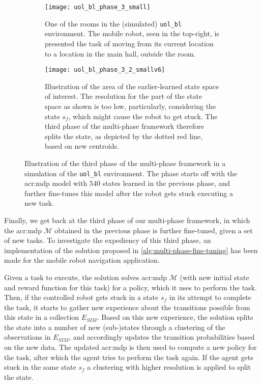 \begin{figure}
	\centering
	\captionsetup{font=small}
	\captionsetup[subfigure]{font=footnotesize}
	\begin{subfigure}{0.475\textwidth}
		\centering
		\texttt{[image: uol\_bl\_phase\_3\_small]}
		\caption{One of the rooms in the (simulated) \texttt{uol\_bl} environment. The mobile robot, seen in the top-right, is presented the task of moving from its current location to a location in the main hall, outside the room.}
		\label{fig:uol_bl_tuning_1}
	\end{subfigure}
	\hfill
	\begin{subfigure}{0.475\textwidth}
		\centering
		\vspace{19.5pt}
		\texttt{[image: uol\_bl\_phase\_3\_2\_smallv6]}
		\caption{Illustration of the area of the earlier-learned state space of interest. The resolution for the part of the state space as shown is too low, particularly, considering the state $s_f$, which might cause the robot to get stuck. The third phase of the multi-phase framework therefore splits the state, as depicted by the dotted red line, based on new centroids.}
		\label{fig:uol_bl_tuning_2}
	\end{subfigure}
	\bigskip
	
	\caption{Illustration of the third phase of the multi-phase framework in a simulation of the \texttt{uol\_bl} environment. The phase starts off with the \acrshort{acr:mdp} model with $540$ states learned in the previous phase, and further fine-tunes this model after the robot gets stuck executing a new task.}
	\label{fig:uol_bl_tuning}
\end{figure}

Finally, we get back at the third phase of our multi-phase framework, in which the \acrshort{acr:mdp} $\mathcal{M}$ obtained in the previous phase is further fine-tuned, given a set of new tasks.
To investigate the expediency of this third phase, an implementation of the solution proposed in \autoref{alg:multi-phase-fine-tuning} has been made for the mobile robot navigation application.

Given a task to execute, the solution solves \acrshort{acr:mdp} $\mathcal{M}$ (with new initial state and reward function for this task) for a policy, which it uses to perform the task.
Then, if the controlled robot gets stuck in a state $s_f$ in its attempt to complete the task, it starts to gather new experience about the transitions possible from this state in a collection $E_\mathit{SIM}$.
Based on this new experience, the solution splits the state into a number of new (sub-)states through a clustering of the observations in $E_\mathit{SIM}$, and accordingly updates the transition probabilities based on the new data.
The updated \acrshort{acr:mdp} is then used to compute a new policy for the task, after which the agent tries to perform the task again.
If the agent gets stuck in the same state $s_f$ a clustering with higher resolution is applied to split the state.

